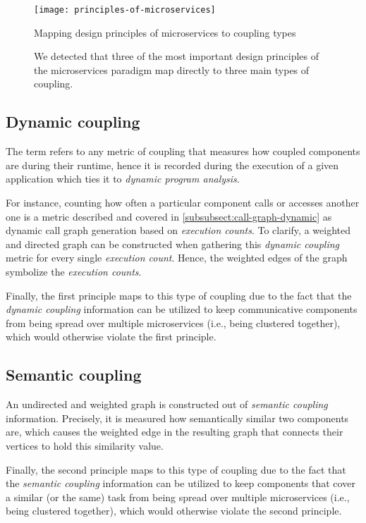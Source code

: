 \documentclass[12pt,a4paper]{report}
\begin{document}
\begin{figure}[htbp]
\centering
\texttt{[image: principles-of-microservices]}
\caption{Mapping design principles of microservices to coupling types}
\caption*{\centering
  We detected that three of the most important design principles of the
  microservices paradigm map directly to three main types of coupling.
}
\label{fig:principles-of-microservices}
\end{figure}


\subsection{Dynamic coupling}

The term refers to any metric of coupling that measures how coupled components
are during their runtime, hence it is recorded during the execution of a given
application which ties it to \textit{dynamic program analysis}.

For instance, counting how often a particular component calls or accesses
another one is a metric described and covered in
\ref{subsubsect:call-graph-dynamic} as dynamic call graph generation based on
\textit{execution counts}.
To clarify, a weighted and directed graph can be constructed when gathering
this \textit{dynamic coupling} metric for every single \textit{execution count}.
Hence, the weighted edges of the graph symbolize the \textit{execution counts}.

Finally, the first principle maps to this type of coupling due to the fact that
the \textit{dynamic coupling} information can be utilized to keep communicative
components from being spread over multiple microservices (i.e., being clustered
together), which would otherwise violate the first principle.


\subsection{Semantic coupling}

An undirected and weighted graph is constructed out of \textit{semantic
coupling} information. Precisely, it is measured how semantically similar two
components are, which causes the weighted edge in the resulting graph that
connects their vertices to hold this similarity value.

Finally, the second principle maps to this type of coupling due to the fact
that the \textit{semantic coupling} information can be utilized to keep
components that cover a similar (or the same) task from being spread over
multiple microservices (i.e., being clustered together), which would otherwise
violate the second principle.
\end{document}
